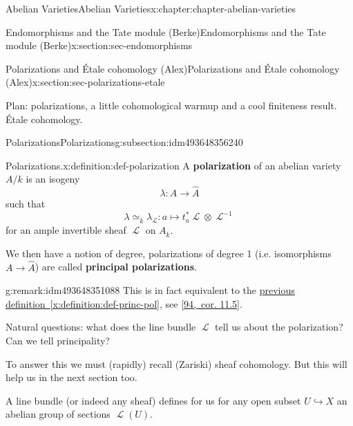 \documentclass[oneside,10pt,]{book}
\newcommand{\terminology}[1]{\textbf{#1}}
\numberwithin{equation}{section}
\newcommand{\sheaf}[1]{\operatorname{\mathcal{#1}}}
\begin{document}
\begin{chapterptx}{Abelian Varieties}{}{Abelian Varieties}{}{}{x:chapter:chapter-abelian-varieties}
\begin{sectionptx}{Endomorphisms and the Tate module (Berke)}{}{Endomorphisms and the Tate module (Berke)}{}{}{x:section:sec-endomorphisms}
\end{sectionptx}
%
%
\typeout{************************************************}
\typeout{************************************************}
%
\begin{sectionptx}{Polarizations and Étale cohomology (Alex)}{}{Polarizations and Étale cohomology (Alex)}{}{}{x:section:sec-polarizations-etale}
\begin{introduction}{}%
Plan: polarizations, a little cohomological warmup and a cool finiteness result. Étale cohomology.%
\end{introduction}%
%
%
\typeout{************************************************}
\typeout{************************************************}
%
\begin{subsectionptx}{Polarizations}{}{Polarizations}{}{}{g:subsection:idm493648356240}
\begin{definition}{Polarizations.}{x:definition:def-polarization}%
A \terminology{polarization} of an abelian variety \(A/k\) is an isogeny%
\begin{equation*}
\lambda \colon A \to \hat A
\end{equation*}
such that%
\begin{equation*}
\lambda \simeq_{\overline k} \lambda_{\sheaf{L}} : a\mapsto t_a^*\sheaf L \otimes \sheaf L^{-1}
\end{equation*}
for an ample invertible sheaf \(\sheaf L\) on \(A_{\overline k}\).%
\par
We then have a notion of degree, polarizations of degree 1 (i.e. isomorphisms \(A\to \hat A\)) are called \terminology{principal polarizations}.%
\end{definition}
\begin{remark}{}{g:remark:idm493648351088}%
This is in fact equivalent to the \hyperref[x:definition:def-princ-pol]{previous definition~\ref{x:definition:def-princ-pol}}, see \hyperlink{x:biblio:bib-vandergeer-moonen}{[94,~cor. 11.5]}.%
\end{remark}
Natural questions: what does the line bundle \(\sheaf L\) tell us about the polarization? Can we tell principality?%
\par
To answer this we must (rapidly) recall (Zariski) sheaf cohomology. But this will help us in the next section too.%
\par
A line bundle (or indeed any sheaf) defines for us for any open subset \(U \hookrightarrow X\) an abelian group of sections \(\sheaf L(U)\).%

\end{subsectionptx}
\end{sectionptx}
\end{chapterptx}
\end{document}
